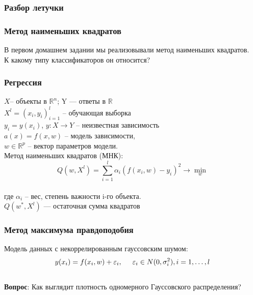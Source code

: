 \documentclass[12pt, aspectratio=169]{beamer}
\subtitle{Лекция 11. Линейная регрессия. PCA.}
\begin{document}
	
\frame{\titlepage}

\begin{frame}\frametitle{Разбор летучки}

\end{frame}

\begin{frame}\frametitle{Метод наименьших квадратов}
В первом домашнем задании мы реализовывали метод наименьших квадратов.\\
К какому типу классификаторов он относится?
\end{frame}

\begin{frame}\frametitle{Регрессия}
$X$-- объекты в $\mathbb{R}^n$; Y — ответы в $\mathbb{R}$\\
$X^l = (x_i, y_i)_{i=1}^l$ -- обучающая выборка\\
$y_i = y(x_i)$,  $y : X \rightarrow Y$ -- неизвестная зависимость\\
\vspace{5mm}
$a(x) = f (x, w)$ -- модель зависимости,\\
$w \in \mathbb{R}^p$ -- вектор параметров модели.\\
\vspace{5mm}
Метод наименьших квадратов (МНК):\\
$$Q(w,X^l) = \sum\limits_{i=1}^l \alpha_i (f (x_i, w) - y_i)^2 \rightarrow \min\limits_{w}$$\\
где $\alpha_i$ -- вес, степень важности i-го объекта.\\
$Q(w^*,X^l)$ — остаточная сумма квадратов

\end{frame}

\begin{frame}\frametitle{Метод максимума правдоподобия}
Модель данных с некоррелированным гауссовским шумом:\\
$$y(x_i) = f (x_i, w) + \varepsilon_i, \hspace{5mm} \varepsilon_i \in N (0, \sigma_i^2), i = 1, \dots, l$$\\
\vspace{5mm}
\textbf{Вопрос}: Как выглядит плотность одномерного Гауссовского распределения?
\end{frame}
\end{document}

